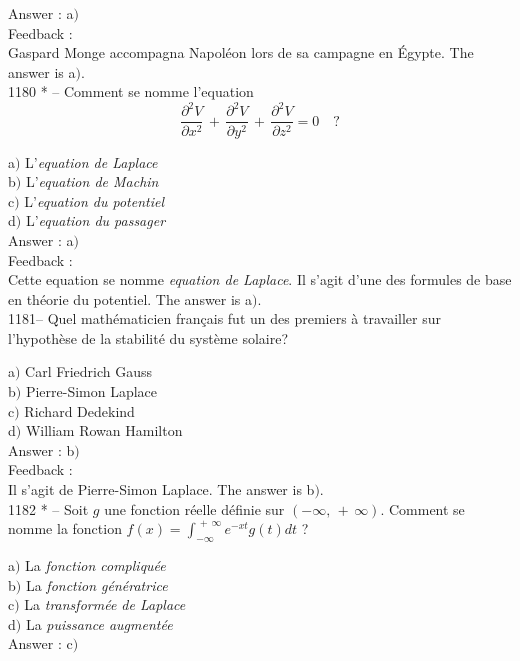 \documentclass[letterpaper, 12pt]{article}
\begin{document}
Answer : a$)$\\

Feedback : \\
Gaspard Monge accompagna Napol\'eon lors de sa campagne en \'Egypte.
The answer is a$)$.\\

1180 * -- Comment se nomme l'equation
$$\displaystyle{\frac{\partial^2V}{\partial
x^2}\,+\,\frac{\partial^2V}{\partial y^2}\,+\,\frac{\partial^2V}{\partial
z^2}=0}\quad?$$

a$)$ L'{\sl equation de Laplace} \\
b$)$ L'{\sl equation de Machin} \\
c$)$ L'{\sl equation du potentiel} \\
d$)$ L'{\sl equation du passager}\\


Answer : a$)$\\

Feedback : \\
Cette equation se nomme {\sl equation de Laplace}. Il s'agit
d'une des formules de base en th\'eorie du potentiel.
The answer is a$)$.\\

1181-- Quel math\'ematicien fran\c cais fut un des premiers \`a
travailler sur l'hypoth\`ese de la stabilit\'e du syst\`eme solaire?

a$)$ Carl Friedrich Gauss \\
b$)$ Pierre-Simon Laplace \\
c$)$ Richard Dedekind \\
d$)$ William Rowan Hamilton\\

Answer : b$)$\\

Feedback : \\
Il s'agit de Pierre-Simon Laplace.
The answer is b$)$.\\

1182 * -- Soit $g$ une fonction r\'eelle d\'efinie sur
$(-\infty,\,+\,\infty)$. Comment se nomme la fonction
$f(x)=\int_{-\infty}^{\,+\,\infty}e^{-xt}g(t)dt$ ?

a$)$ La {\sl fonction compliqu\'ee} \\
b$)$ La {\sl fonction g\'en\'eratrice} \\
c$)$ La {\sl transform\'ee de Laplace} \\
d$)$ La {\sl puissance augment\'ee}\\

Answer : c$)$\\
\end{document}
